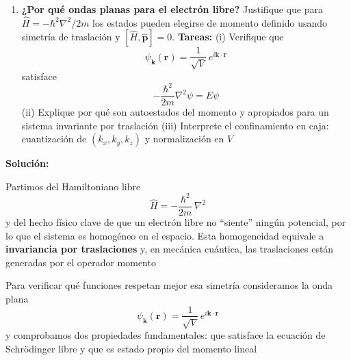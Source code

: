 \documentclass{article}
\newenvironment{AGbox}[1][7]%
{%
  \begin{tcolorbox}[
    enhanced, breakable,
    colframe=AppleGreen,
    colback=AppleGreen!#1,
    boxrule=1pt,
    borderline west={2mm}{-10mm}{AppleGreen},
    sharp corners=southwest,
    left=14pt,right=14pt,top=10pt,bottom=10pt,
     boxsep=6pt,
  ]%
}{%
  \end{tcolorbox}%
}
\begin{document}
\begin{AGbox}[8]
\begin{enumerate}[label={{\textcolor{trueblue}{\textbf{Pr.} \arabic*.6}}}, start=6]
  \item \textcolor{Cerulean}{\textbf{¿Por qué ondas planas para el electrón libre?}}
  Justifique que para $\hat H=-\hbar^2\nabla^2/2m$ los estados pueden elegirse de momento definido usando simetría de traslación y $[\hat H,\hat{\mathbf p}]=0$. 
  \textbf{Tareas:}
  (i) Verifique que
  \begin{equation}\label{eq:plane-wave}
    \psi_{\mathbf k}(\mathbf r)=\frac{1}{\sqrt{V}}\,e^{i\mathbf k\cdot\mathbf r}
  \end{equation}
  satisface
  \begin{equation}\label{eq:free-schrodinger}
    -\frac{\hbar^2}{2m}\nabla^2\psi=E\psi
  \end{equation}
  (ii) Explique por qué son autoestados del momento y apropiados para un sistema invariante por traslación
  (iii) Interprete el confinamiento en caja: cuantización de $(k_x,k_y,k_z)$ y normalización en $V$
\end{enumerate}
\end{AGbox}

\vspace{0.5cm}\textcolor{Cinnabar}{\textbf{Solución:}}

Partimos del Hamiltoniano libre
\begin{equation}\label{eq:H-libre}
\hat H=-\frac{\hbar^2}{2m}\,\nabla^2
\end{equation}
y del hecho físico clave de que un electrón libre no “siente” ningún potencial, por lo que el sistema es homogéneo en el espacio. Esta homogeneidad equivale a \textcolor{Cerulean}{\textbf{invariancia por traslaciones}} y, en mecánica cuántica, las traslaciones están generadas por el operador momento

Para verificar qué funciones respetan mejor esa simetría consideramos la onda plana
\begin{equation}\label{eq:psi-plane}
\psi_{\mathbf k}(\mathbf r)=\frac{1}{\sqrt V}\,e^{i\mathbf k\cdot\mathbf r}
\end{equation}
y comprobamos dos propiedades fundamentales: que satisface la ecuación de Schrödinger libre y que es estado propio del momento lineal
\end{document}
